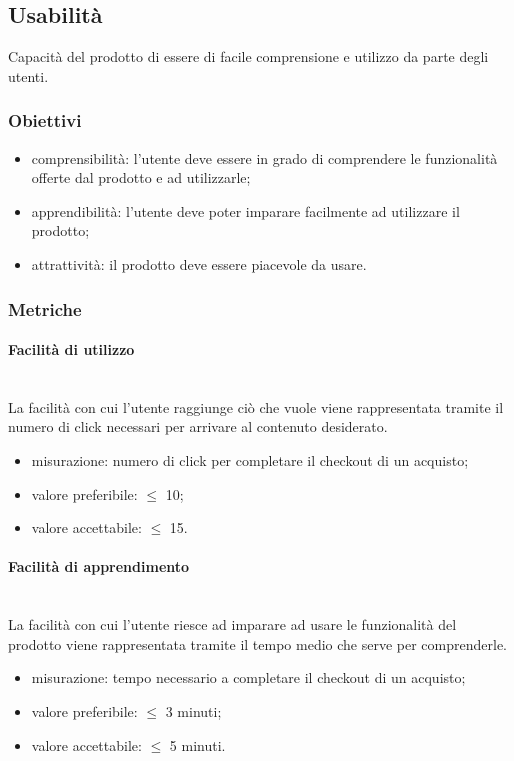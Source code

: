 	\subsection{Usabilità}
	Capacità del prodotto di essere di facile comprensione e utilizzo da parte degli utenti.
		\subsubsection{Obiettivi}
		\begin{itemize}
			\item comprensibilità: l'utente deve essere in grado di comprendere le funzionalità offerte dal prodotto e ad utilizzarle;
			\item apprendibilità: l'utente deve poter imparare facilmente ad utilizzare il prodotto;
			\item attrattività: il prodotto deve essere piacevole da usare.
		\end{itemize}
		\subsubsection{Metriche}
			\paragraph{Facilità di utilizzo}\mbox{}\\
			La facilità con cui l'utente raggiunge ciò che vuole viene rappresentata tramite il numero di click necessari per arrivare al contenuto desiderato.
			\begin{itemize}
			\item misurazione: numero di click per completare il checkout di un acquisto;
			\item valore preferibile: $\leq$ 10;
			\item valore accettabile: $\leq$ 15.
			\end{itemize}
			\paragraph{Facilità di apprendimento}\mbox{}\\
			La facilità con cui l'utente riesce ad imparare ad usare le funzionalità del prodotto viene rappresentata tramite il tempo medio che serve per comprenderle.
			\begin{itemize}
			\item misurazione: tempo necessario a completare il checkout di un acquisto;
			\item valore preferibile: $\leq$ 3 minuti;
			\item valore accettabile: $\leq$ 5 minuti.
			\end{itemize}
		
